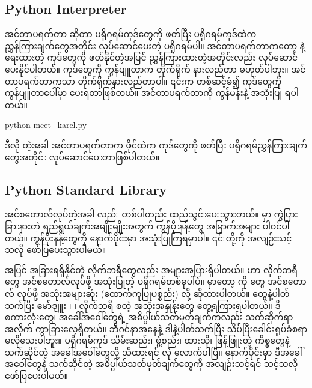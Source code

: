\subsection*{Python Interpreter}
အင်တာပရက်တာ ဆိုတာ ပရိုဂရမ်ကုဒ်တွေကို ဖတ်ပြီး ပရိုဂရမ်ကုဒ်ထဲက ညွှန်ကြားချက်တွေအတိုင်း လုပ်ဆောင်ပေးတဲ့ ပရိုဂရမ်ပါ။  အင်တာပရက်တာကတော့  နဲ့ရေးထားတဲ့ ကုဒ်တွေကို ဖတ်နိုင်တဲ့အပြင် ညွှန်ကြားထားတဲ့အတိုင်းလည်း လုပ်ဆောင်ပေးနိုင်ပါတယ်။  ကုဒ်တွေကို ကွန်ပျူတာက တိုက်ရိုက် နားလည်တာ မဟုတ်ပါဘူး။ အင်တာပရက်တာကသာ တိုက်ရိုက်နားလည်တာပါ။ ၎င်းက တစ်ဆင့်ခံ၍  ကုဒ်တွေကို ကွန်ပျူတာပေါ်မှာ  ပေးရတာဖြစ်တယ်။ အင်တာပရက်တာကို  ကွန်မန်းနဲ့ အသုံးပြု  ရပါတယ်။
%
\begin{codetxt}
python meet_karel.py
\end{codetxt}
%
ဒီလို  တဲ့အခါ  အင်တာပရက်တာက  ဖိုင်ထဲက ကုဒ်တွေကို ဖတ်ပြီး ပရိုဂရမ်ညွှန်ကြား\allowbreak ချက်တွေအတိုင်း လုပ်ဆောင်ပေးတာဖြစ်ပါတယ်။

\subsection*{Python Standard Library}
 အင်စတောလ်လုပ်တဲ့အခါ  လည်း တစ်ပါတည်း ထည့်သွင်းပေးသွားတယ်။  မှာ ကွဲပြားခြားနားတဲ့ ရည်ရွယ်ချက်အမျိုးမျိုးအတွက် ကွန်ပိုးနန့်တွေ အမြာက်အများ ပါဝင်ပါတယ်။  ကွန်ပိုးနန့်တွေကို နောက်ပိုင်းမှာ အသုံးပြုကြရမှာပါ။ ၎င်းတို့ကို အ\allowbreak လျဉ်းသင့်သလို ဖော်ပြပေးသွားပါမယ်။

 အပြင် အခြားရရှိနိုင်တဲ့ လိုက်ဘရီတွေလည်း အများအပြားရှိပါတယ်။  ဟာ လိုက်ဘရီတွေ  အင်စတောလ်လုပ်ဖို့ အသုံးပြုတဲ့ ပရိုဂရမ်တစ်ခုပါပဲ။  မှာတော့  ကို  တွေ အင်စတောလ် လုပ်ဖို့ အသုံးအများဆုံး  (ထောက်ကူပြုပစ္စည်း) လို့ ဆိုထားပါတယ်။  တွေနဲ့ပါတ်သက်ပြီး မော်ဒျူး ၊  ၊ လိုက်ဘရီ  စတဲ့ အသုံးအနှုန်းတွေ တွေ့ရကြားရပါတယ်။ ဒီစကားလုံးတွေ၊ အခေါ်အဝေါ်တွေရဲ့ အဓိပ္ပါယ်သတ်မှတ်ချက်ကလည်း သက်ဆိုက်ရာ  အလိုက် ကွာ\allowbreak ခြားလေ့ရှိတယ်။ ဘီဂင်နာအနေနဲ့ ဒါနဲ့ပါတ်သက်ပြီး သိပ်ပြီးခေါင်းရှုပ်ခံစရာ မလိုသေးပါဘူး။ ပရိုဂရမ်ကုဒ် သိမ်းဆည်း၊ ဖွဲ့စည်း၊ ထားသို၊ ဖြန့်ဖြူးတဲ့ ကိစ္စတွေနဲ့ သက်ဆိုင်တဲ့ အခေါ်အဝေါ်တွေလို့ သိထားရင် လုံ \allowbreak လောက်ပါပြီ။ နောက်ပိုင်းမှာ ဒီအခေါ်အဝေါ်တွေနဲ့ သက်ဆိုင်တဲ့ အဓိပ္ပါယ်သတ်မှတ်ချက်တွေကို အ\allowbreak  လျဉ်း\allowbreak သင့်ရင် သင့်သလို ဖော်ပြပေးပါမယ်။



